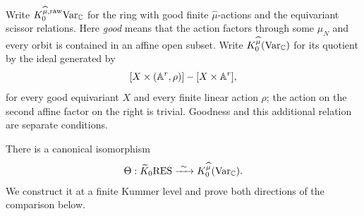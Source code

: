 \begin{nota}\label{bipo:gdv}
Write $K_0^{\widehat\mu,\mathrm{raw}}\mathrm{Var}_{\mathbb C}$ for the ring with good finite
$\widehat\mu$-actions and the equivariant scissor relations.
Here \emph{good} means that the action factors through some $\mu_N$
and every orbit is contained in an affine open subset.
Write $K_0^{\widehat\mu}(\mathrm{Var}_{\mathbb C})$ for its quotient by the ideal generated by
\[
 [X\times(\mathbb A^r,\rho)]-[X\times\mathbb A^r],
\]
for every good equivariant $X$ and every finite linear action
$\rho$; the action on the second affine factor on the right is
trivial. Goodness and this additional relation are separate
conditions.

There is a canonical isomorphism
\[
 \Theta:\widetilde K_0\mathrm{RES}\xrightarrow{\ \sim\ }K_0^{\widehat\mu}(\mathrm{Var}_{\mathbb C}) .
\]
We construct it at a finite Kummer level and prove both
directions of the comparison below.
\end{nota}

